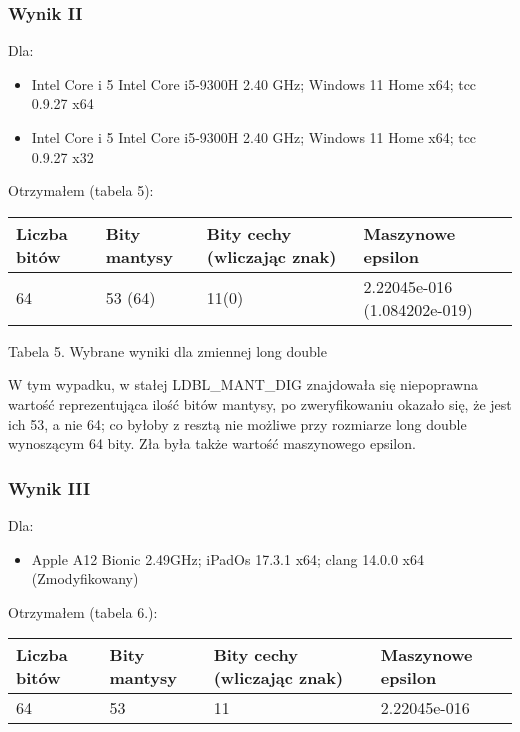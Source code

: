 \documentclass{article}
\begin{document}
\subsubsection{Wynik II}

Dla:

\begin{itemize}
\item Intel Core i 5 Intel Core i5-9300H 2.40 GHz; Windows 11 Home x64; tcc 0.9.27 x64
\item Intel Core i 5 Intel Core i5-9300H 2.40 GHz; Windows 11 Home x64; tcc 0.9.27 x32
\end{itemize}
\bigbreak
Otrzymałem (tabela 5):

\begin{table}[!ht]
    \centering
    \begin{tabular}{|l|l|l|l|}
    \hline
        Liczba bitów & Bity mantysy & Bity cechy (wliczając znak) & Maszynowe epsilon  \\ \hline
        64 & 53 (64) & 11(0) & 2.22045e-016 (1.084202e-019) \\ \hline
    \end{tabular}
\end{table}

\centerline{Tabela 5. Wybrane wyniki dla zmiennej long double}
\bigbreak

\noindent
W tym wypadku, w stałej LDBL\_MANT\_DIG znajdowała się niepoprawna wartość reprezentująca ilość bitów mantysy, po zweryfikowaniu okazało się, że jest ich 53, a nie 64; co byłoby z resztą nie możliwe przy rozmiarze long double wynoszącym 64 bity. Zła była także wartość maszynowego epsilon.

\subsubsection{Wynik III}

Dla:
\begin{itemize}
\item Apple A12 Bionic 2.49GHz; iPadOs 17.3.1 x64; clang 14.0.0 x64 (Zmodyfikowany)
\end{itemize}

Otrzymałem (tabela 6.):

\begin{table}[!ht]
    \centering
    \begin{tabular}{|l|l|l|l|}
    \hline
        Liczba bitów & Bity mantysy & Bity cechy (wliczając znak) & Maszynowe epsilon  \\ \hline
        64 & 53 & 11 & 2.22045e-016 \\ \hline
    \end{tabular}
\end{table}
\end{document}
